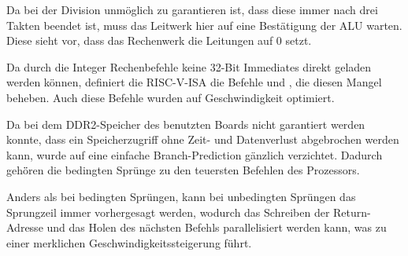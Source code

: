 Da bei der Division unm\"oglich zu garantieren ist, dass diese immer nach drei
Takten beendet ist, muss das Leitwerk hier auf eine Best\"atigung der ALU
warten. Diese sieht vor, dass das Rechenwerk die Leitungen 
auf 0 setzt.


Da durch die Integer Rechenbefehle keine 32-Bit Immediates direkt geladen werden
k\"onnen, definiert die RISC-V-ISA die Befehle  und , die
diesen Mangel beheben. Auch diese Befehle wurden auf Geschwindigkeit optimiert.



Da bei dem DDR2-Speicher des benutzten Boards nicht garantiert werden
konnte, dass ein Speicherzugriff ohne Zeit- und Datenverlust abgebrochen
werden kann, wurde auf eine einfache Branch-Prediction g\"anzlich verzichtet.
Dadurch geh\"ören die bedingten Spr\"unge zu den teuersten Befehlen des
Prozessors.



Anders als bei bedingten Spr\"ungen, kann bei unbedingten Spr\"ungen das
Sprungzeil immer vorhergesagt werden, wodurch das Schreiben der Return-Adresse
und das Holen des n\"achsten Befehls parallelisiert werden kann, was zu einer
merklichen Geschwindigkeitssteigerung f\"uhrt.


